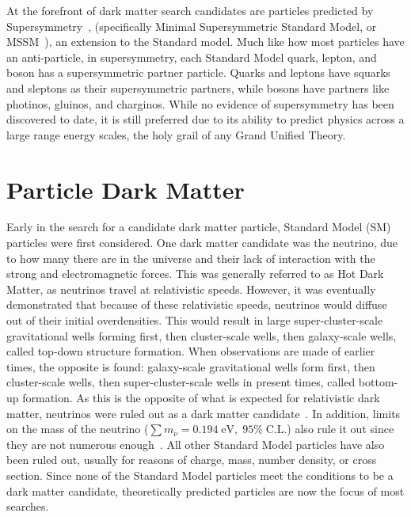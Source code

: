   At the forefront of dark matter search candidates are particles predicted by Supersymmetry~\cite{Jungman:1995df}, (specifically Minimal Supersymmetric Standard Model, or MSSM~\cite{MSSM,supersym1}), an extension to the Standard model.
  Much like how most particles have an anti-particle, in supersymmetry, each Standard Model quark, lepton, and boson has a supersymmetric partner particle.
  Quarks and leptons have squarks and sleptons as their supersymmetric partners, while bosons have partners like photinos, gluinos, and charginos.
  While no evidence of supersymmetry has been discovered to date, it is still preferred due to its ability to predict physics across a large range energy scales, the holy grail of any Grand Unified Theory.
  

\section{Particle Dark Matter}\label{sec_particledm}

  Early in the search for a candidate dark matter particle, Standard Model (SM) particles were first considered.
  One dark matter candidate was the neutrino, due to how many there are in the universe and their lack of interaction with the strong and electromagnetic forces.
  This was generally referred to as Hot Dark Matter, as neutrinos travel at relativistic speeds.
  However, it was eventually demonstrated that because of these relativistic speeds, neutrinos would diffuse out of their initial overdensities.
  This would result in large super-cluster-scale gravitational wells forming first, then cluster-scale wells, then galaxy-scale wells, called top-down structure formation.
  When observations are made of earlier times, the opposite is found: galaxy-scale gravitational wells form first, then cluster-scale wells, then super-cluster-scale wells in present times, called bottom-up formation.
  As this is the opposite of what is expected for relativistic dark matter, neutrinos were ruled out as a dark matter candidate~\cite{neutrinoHeirarchical}.
  In addition, limits on the mass of the neutrino ($\sum{}m_{\nu} = 0.194 \; \textrm{eV}, \; 95\% \; \textrm{C.L.}$) also rule it out since they are not numerous enough~\cite{planck2015}.
  All other Standard Model particles have also been ruled out, usually for reasons of charge, mass, number density, or cross section.
  Since none of the Standard Model particles meet the conditions to be a dark matter candidate, theoretically predicted particles are now the focus of most searches.
  
